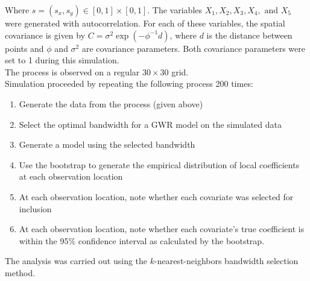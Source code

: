 \documentclass[authoryear ,review]{elsarticle}
\begin{document}
			Where $s=(s_x, s_y) \in [0,1] \times [0,1]$. The variables $X_1, X_2, X_3, X_4, \text{ and } X_5$ were generated with autocorrelation. For each of these variables, the spatial covariance is given by $C = \sigma^2 \exp(-\phi^{-1} d)$, where $d$ is the distance between points and $\phi$ and $\sigma^2$ are covariance parameters. Both covariance parameters were set to 1 during this simulation.\\

			The process is observed on a regular $30 \times 30$ grid.\\		
			
			Simulation proceeded by repeating the following process 200 times:\\
			
			\begin{enumerate}
				\item Generate the data from the process (given above)
				\item Select the optimal bandwidth for a GWR model on the simulated data
				\item Generate a model using the selected bandwidth
				\item Use the bootstrap to generate the empirical distribution of local coefficients at each observation location
				\item At each observation location, note whether each covariate was selected for inclusion
				\item At each observation location, note whether each covariate's true coefficient is within the 95\% confidence interval as calculated by the bootstrap.
			\end{enumerate}
				
			The analysis was carried out using the $k$-nearest-neighbors bandwidth selection method.\\			
			
\end{document}
